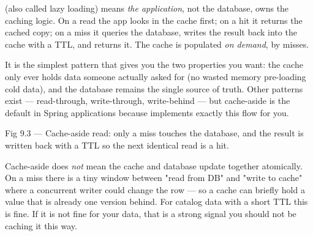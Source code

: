 
  (also called lazy loading) means \emph{the application}, not the database, owns the caching logic. On a read the app looks in the cache first; on a hit it returns the cached copy; on a miss it queries the database, writes the result back into the cache with a TTL, and returns it. The cache is populated \emph{on demand}, by misses.

 It is the simplest pattern that gives you the two properties you want: the cache only ever holds data someone actually asked for (no wasted memory pre-loading cold data), and the database remains the single source of truth. Other patterns exist --- read-through, write-through, write-behind --- but cache-aside is the default in Spring applications because  implements exactly this flow for you.

\begin{wbfigure}{Fig 9.3 --- Cache-aside read: only a miss touches the database, and the result is written back with a TTL so the next identical read is a hit.}
\end{wbfigure}

\begin{misconception}
Cache-aside does \emph{not} mean the cache and database update together atomically. On a miss there is a tiny window between "read from DB" and "write to cache" where a concurrent writer could change the row --- so a cache can briefly hold a value that is already one version behind. For catalog data with a short TTL this is fine. If it is not fine for your data, that is a strong signal you should not be caching it this way.
\end{misconception}

